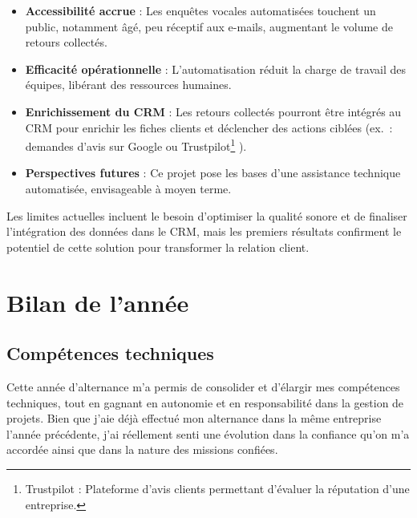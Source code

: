 \begin{itemize}
    \item \textbf{Accessibilité accrue} : Les enquêtes vocales automatisées touchent un public, notamment âgé, peu réceptif aux e-mails, augmentant le volume de retours collectés.\vspace{0.3cm}
    \item \textbf{Efficacité opérationnelle} : L’automatisation réduit la charge de travail des équipes, libérant des ressources humaines.\vspace{0.3cm}
    \item \textbf{Enrichissement du CRM} : Les retours collectés pourront être intégrés au CRM pour enrichir les fiches clients et déclencher des actions ciblées (ex.~: demandes d’avis sur Google ou Trustpilot\footnote{Trustpilot : Plateforme d’avis clients permettant d’évaluer la réputation d’une entreprise.}
).\vspace{0.3cm}
    \item \textbf{Perspectives futures} : Ce projet pose les bases d’une assistance technique automatisée, envisageable à moyen terme.\vspace{0.3cm}
\end{itemize}

Les limites actuelles incluent le besoin d’optimiser la qualité sonore et de finaliser l’intégration des données dans le CRM, mais les premiers résultats confirment le potentiel de cette solution pour transformer la relation client.\vspace{0.3cm}






\section{Bilan de l’année}
\label{bilan}

\subsection{Compétences techniques}

Cette année d’alternance m’a permis de consolider et d’élargir mes compétences techniques, tout en gagnant en autonomie et en responsabilité dans la gestion de projets. Bien que j’aie déjà effectué mon alternance dans la même entreprise l’année précédente, j’ai réellement senti une évolution dans la confiance qu’on m’a accordée ainsi que dans la nature des missions confiées.

